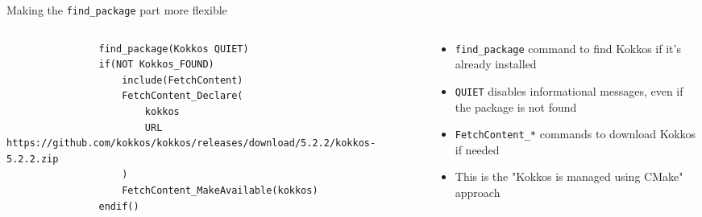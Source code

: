 \documentclass[
    aspectratio=169,
    \createHandout
]{beamer}
\begin{document}
\begin{frame}[fragile]{Making the \texttt{find\_package} part more flexible}
    \begin{columns}
        \begin{column}{0.6\linewidth}
            \begin{verbatim}
                find_package(Kokkos QUIET)
                if(NOT Kokkos_FOUND)
                    include(FetchContent)
                    FetchContent_Declare(
                        kokkos
                        URL https://github.com/kokkos/kokkos/releases/download/5.2.2/kokkos-5.2.2.zip
                    )
                    FetchContent_MakeAvailable(kokkos)
                endif()
            \end{verbatim}
        \end{column}
        \begin{column}{0.4\linewidth}
            \begin{itemize}
                \item \texttt{find\_package} command to find Kokkos if it's already installed
                \item \texttt{QUIET} disables informational messages, even if the package is not found
                \item \texttt{FetchContent\_*} commands to download Kokkos if needed
                \item This is the "Kokkos is managed using CMake" approach
            \end{itemize}
        \end{column}
    \end{columns}
\end{frame}

\end{document}

